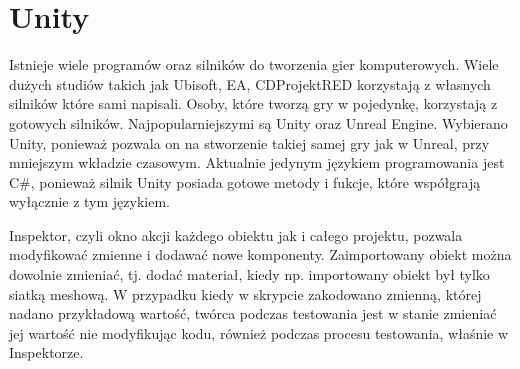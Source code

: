 \section{Unity}

\indent Istnieje wiele programów oraz silników do tworzenia gier komputerowych. Wiele dużych studiów takich jak Ubisoft, EA, CDProjektRED korzystają z własnych silników które sami napisali. Osoby, które tworzą gry w pojedynkę, korzystają z gotowych silników. Najpopularniejszymi są Unity oraz Unreal Engine. Wybierano Unity, ponieważ pozwala on na stworzenie takiej samej gry jak w Unreal, przy mniejszym wkładzie czasowym. Aktualnie jedynym językiem programowania jest C\#, ponieważ silnik Unity posiada gotowe metody i fukcje, które współgrają wyłącznie z tym językiem.

\indent Inspektor, czyli okno akcji każdego obiektu jak i całego projektu, pozwala modyfikować zmienne i dodawać nowe komponenty. Zaimportowany obiekt można dowolnie zmieniać, tj. dodać materiał, kiedy np. importowany obiekt był tylko siatką meshową. W przypadku kiedy w skrypcie zakodowano zmienną, której nadano przykładową wartość, twórca podczas testowania jest w stanie zmieniać jej wartość nie modyfikując kodu, również podczas procesu testowania, właśnie w Inspektorze. 

